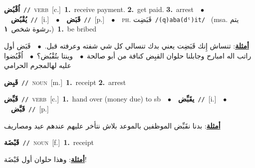 \documentclass[10pt,a4paper,twoside]{article} %
\begin{document}
\begin{multicols}{2}
{{{{{{{\setlength\topsep{0pt}\textbf{\foreignlanguage{arabic}{اُقْبُض}}\ {\color{gray}\texttt{//}\color{black}}\ \textsc{verb}\ [c.]\ \textbf{1.}~receive payment.  \textbf{2.}~get paid.  \textbf{3.}~arrest\ \ $\bullet$\ \ \setlength\topsep{0pt}\textbf{\foreignlanguage{arabic}{يُقْبُض}}\ {\color{gray}\texttt{//}\color{black}}\ [i.]\ \ $\bullet$\ \ \setlength\topsep{0pt}\textbf{\foreignlanguage{arabic}{قَبَض}}\ {\color{gray}\texttt{//}\color{black}}\ [p.]\ \ $\bullet$\ \ \textsc{ph.} \color{gray} \foreignlanguage{arabic}{قَبَضِت}\color{black}\ {\color{gray}\texttt{/{\sffamily (q)aba(dˤ)it}/}\color{black}}\ \color{gray} (msa. \foreignlanguage{arabic}{يتم رشوة شخص}~\foreignlanguage{arabic}{\textbf{١.}})\color{black}\ \textbf{1.}~be bribed\  \begin{flushright}\color{gray}\foreignlanguage{arabic}{\textbf{\underline{\foreignlanguage{arabic}{أمثلة}}}: تنساش إِنك قَبَضِت يعني بدك تنسالي كل شي شفته وعرفته قبل.\ $\bullet$\ \  قَبَض أول راتب اله امبارح وجابلنا حلوان القبِض كنافة من أبو صالحة\ $\bullet$\ \  وينتا بتُقْبُض؟\ $\bullet$\ \  اُقْبُضوا عليه لهالمجرم الحرامي}\end{flushright}\color{black}} \vspace{2mm}

{\setlength\topsep{0pt}\textbf{\foreignlanguage{arabic}{قَبِض}}\ {\color{gray}\texttt{//}\color{black}}\ \textsc{noun}\ [m.]\ \textbf{1.}~receipt  \textbf{2.}~arrest\ 

{\setlength\topsep{0pt}\textbf{\foreignlanguage{arabic}{قَبِّض}}\ {\color{gray}\texttt{//}\color{black}}\ \textsc{verb}\ [c.]\ \textbf{1.}~hand over (money due) to sb\ \ $\bullet$\ \ \setlength\topsep{0pt}\textbf{\foreignlanguage{arabic}{يقَبِّض}}\ {\color{gray}\texttt{//}\color{black}}\ [i.]\ \ $\bullet$\ \ \setlength\topsep{0pt}\textbf{\foreignlanguage{arabic}{قَبَّض}}\ {\color{gray}\texttt{//}\color{black}}\ [p.]\  \begin{flushright}\color{gray}\foreignlanguage{arabic}{\textbf{\underline{\foreignlanguage{arabic}{أمثلة}}}: بدنا نقَبِّض الموظفين بالموعد بلاش نتأخر عليهم عندهم عيد ومصاريف}\end{flushright}\color{black}} \vspace{2mm}

{\setlength\topsep{0pt}\textbf{\foreignlanguage{arabic}{قَبْضَة}}\ {\color{gray}\texttt{//}\color{black}}\ \textsc{noun}\ [f.]\ \textbf{1.}~receipt\  \begin{flushright}\color{gray}\foreignlanguage{arabic}{\textbf{\underline{\foreignlanguage{arabic}{أمثلة}}}: وهذا حلوان أول قَبْضَة!}\end{flushright}\color{black}} \vspace{2mm}

}}}}}}}
\end{multicols}
\end{document}
